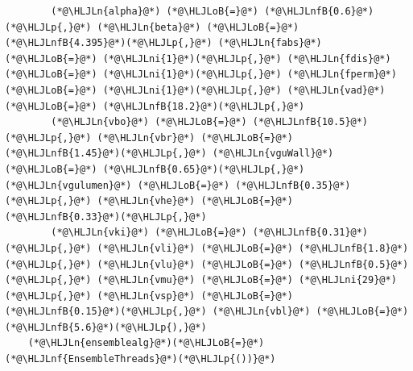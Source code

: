 \documentclass[12pt,a4paper]{article}
\newcommand{\HLJLn}[1]{#1}
\newcommand{\HLJLnf}[1]{\textcolor[RGB]{66,102,213}{#1}}
\newcommand{\HLJLnfB}[1]{\textcolor[RGB]{59,151,46}{#1}}
\newcommand{\HLJLni}[1]{\textcolor[RGB]{59,151,46}{#1}}
\newcommand{\HLJLoB}[1]{\textcolor[RGB]{102,102,102}{\textbf{#1}}}
\newcommand{\HLJLp}[1]{#1}
\begin{document}
\begin{lstlisting}
        (*@\HLJLn{alpha}@*) (*@\HLJLoB{=}@*) (*@\HLJLnfB{0.6}@*)(*@\HLJLp{,}@*) (*@\HLJLn{beta}@*) (*@\HLJLoB{=}@*) (*@\HLJLnfB{4.395}@*)(*@\HLJLp{,}@*) (*@\HLJLn{fabs}@*) (*@\HLJLoB{=}@*) (*@\HLJLni{1}@*)(*@\HLJLp{,}@*) (*@\HLJLn{fdis}@*) (*@\HLJLoB{=}@*) (*@\HLJLni{1}@*)(*@\HLJLp{,}@*) (*@\HLJLn{fperm}@*) (*@\HLJLoB{=}@*) (*@\HLJLni{1}@*)(*@\HLJLp{,}@*) (*@\HLJLn{vad}@*) (*@\HLJLoB{=}@*) (*@\HLJLnfB{18.2}@*)(*@\HLJLp{,}@*)
        (*@\HLJLn{vbo}@*) (*@\HLJLoB{=}@*) (*@\HLJLnfB{10.5}@*)(*@\HLJLp{,}@*) (*@\HLJLn{vbr}@*) (*@\HLJLoB{=}@*) (*@\HLJLnfB{1.45}@*)(*@\HLJLp{,}@*) (*@\HLJLn{vguWall}@*) (*@\HLJLoB{=}@*) (*@\HLJLnfB{0.65}@*)(*@\HLJLp{,}@*) (*@\HLJLn{vgulumen}@*) (*@\HLJLoB{=}@*) (*@\HLJLnfB{0.35}@*)(*@\HLJLp{,}@*) (*@\HLJLn{vhe}@*) (*@\HLJLoB{=}@*) (*@\HLJLnfB{0.33}@*)(*@\HLJLp{,}@*)
        (*@\HLJLn{vki}@*) (*@\HLJLoB{=}@*) (*@\HLJLnfB{0.31}@*)(*@\HLJLp{,}@*) (*@\HLJLn{vli}@*) (*@\HLJLoB{=}@*) (*@\HLJLnfB{1.8}@*)(*@\HLJLp{,}@*) (*@\HLJLn{vlu}@*) (*@\HLJLoB{=}@*) (*@\HLJLnfB{0.5}@*)(*@\HLJLp{,}@*) (*@\HLJLn{vmu}@*) (*@\HLJLoB{=}@*) (*@\HLJLni{29}@*)(*@\HLJLp{,}@*) (*@\HLJLn{vsp}@*) (*@\HLJLoB{=}@*) (*@\HLJLnfB{0.15}@*)(*@\HLJLp{,}@*) (*@\HLJLn{vbl}@*) (*@\HLJLoB{=}@*) (*@\HLJLnfB{5.6}@*)(*@\HLJLp{),}@*)
    (*@\HLJLn{ensemblealg}@*)(*@\HLJLoB{=}@*)(*@\HLJLnf{EnsembleThreads}@*)(*@\HLJLp{())}@*)
\end{lstlisting}
\end{document}
